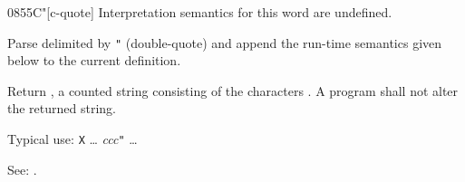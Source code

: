 \begin{worddef}[Cq]{0855}{C"}[c-quote]
\interpret
	Interpretation semantics for this word are undefined.

\compile

	Parse  delimited by \texttt{"} (double-quote) and
	append the run-time semantics given below to the current
	definition.

\runtime

	Return , a counted string consisting of the
	characters . A program shall not alter the returned
	string.


	\begin{rationale} %
		Typical use:
			\word{:} \texttt{X} {\ldots}
				 \emph{ccc}\texttt{"}
			{\ldots} \word{;}

		See: .
	\end{rationale}

	\begin{testing}
		 \\
		 \\
		 \\
	\end{testing}
\end{worddef}


